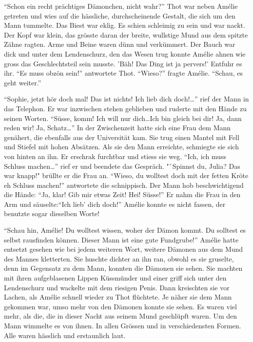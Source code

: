 \documentclass[11pt,titlepage,a5paper]{book}
\begin{document}
"`Schon ein recht prächtiges Dämonchen, nicht wahr?"' Thot war neben Amélie getreten und wies auf die hässliche, durchscheinende Gestalt, die sich um den Mann tummelte. Das Biest war eklig. Es schien schleimig zu sein und war nackt. Der Kopf war klein, das grösste daran der breite, wullstige Mund aus dem spitzte Zähne ragten. Arme und Beine waren dünn und verkümmert. Der Bauch war dick  und unter dem Lendenschurz, den das Wesen trug konnte Amélie ahnen wie gross das Geschlechtsteil sein musste. 'Bäh! Das Ding ist ja pervers!' Entfuhr es ihr. "`Es muss obzön sein!"' antwortete Thot. "`Wieso?"' fragte Amélie. "`Schau, es geht weiter."' 

"`Sophie, jetzt hör doch mal! Das ist nichts! Ich lieb dich doch!\dots"' rief der Mann in das Telephon. Er war inzwischen stehen geblieben und ruderte mit den Hände zu seinen Worten. "`Süsse, komm! Ich will nur dich\dots Ich bin gleich bei dir! Ja, dann reden wir! Ja, Schatz\dots"' In der Zwischenzeit hatte sich eine Frau dem Mann genähert, die ebenfalls aus der Universität kam. Sie trug einen Mantel mit Fell und Stiefel mit hohen Absätzen. Als sie den Mann erreichte, schmiegte sie sich von hinten an ihn. Er erschrak furchtbar und stiess sie weg. "`Ich, ich muss Schluss machen\dots"' rief er und beendete das Gespräch. "`Spinnst du, Julia? Das war knapp!" brüllte er die Frau an. "`Wieso, du wolltest doch mit der fetten Kröte eh Schluss machen!"' antwortete die schnippisch. Der Mann hob beschwichtigend die Hände: "`Ja, klar! Gib mir etwas Zeit! Hei! Süsse!"' Er nahm die Frau in den Arm und säuselte:"`Ich lieb' dich doch!"' Amélie konnte es nicht fassen, der benutzte sogar dieselben Worte! 

"`Schau hin, Amélie! Du wolltest wissen, woher der Dämon kommt. Du solltest es selbst rausfinden können. Dieser Mann ist eine gute Fundgrube!"' Amélie hatte entsetzt gesehen wie bei jedem weiteren Wort, weitere Dämonen aus dem Mund des Mannes kletterten. Sie huschte dichter an ihn ran, obwohl es sie gruselte, denn im Gegensatz zu dem Mann, konnten die Dämonen sie sehen. Sie machten mit ihren aufgeblasenen Lippen Küssmünder und einer griff sich unter den Lendenschurz und wackelte mit dem riesigen Penis. Dann kreischten sie vor Lachen, als Amélie schnell wieder zu Thot flüchtete. Je näher sie dem Mann gekommen war, umso mehr von den Dämonen konnte sie sehen. Es waren viel mehr, als die, die in dieser Nacht aus seinem Mund geschlüpft waren. Um den Mann wimmelte es von ihnen. In allen Grössen und in verschiedensten Formen. Alle waren hässlich und erstaunlich laut.
\end{document}
